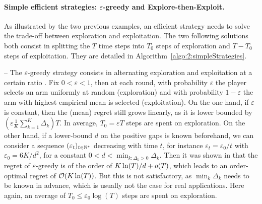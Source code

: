 \paragraph{Simple efficient strategies: $\varepsilon$-greedy and Explore-then-Exploit.}

As illustrated by the two previous examples, an efficient strategy needs to solve the trade-off between exploration and exploitation.
The two following solutions both consist in splitting the $T$ time steps into $T_0$ steps of exploration and $T-T_0$ steps of exploitation.
They are detailed in Algorithm~\ref{algo:2:simpleStrategies}.

-- The \textcolor{deeppurple}{$\varepsilon$-greedy strategy} consists in alternating exploration and exploitation at a certain ratio \cite{Auer02}.
Fix $0<\varepsilon<1$, then at each round, with probability $\varepsilon$ the player selects an arm uniformly at random (exploration) and with probability $1-\varepsilon$ the arm with highest empirical mean is selected (exploitation).
On the one hand, if $\varepsilon$ is constant, then the (mean) regret still grows linearly, as it is lower bounded by $(\varepsilon \frac{1}{K} \sum_{k=1}^K \Delta_k) T$.
In average, $T_0 = \varepsilon T$ steps are spent on exploration.
%
On the other hand, if a lower-bound $d$ on the positive gaps is known beforehand,
we can consider a sequence $(\varepsilon_t)_{t\in\mathbb{N}^*}$ decreasing with time $t$, for instance $\varepsilon_t = \varepsilon_0 / t$ with $\varepsilon_0 = 6 K / d^2$, for a constant $0 < d < \min_{k: \Delta_k > 0} \Delta_k$.
Then it was shown in \cite{Auer02} that the regret of $\varepsilon$-greedy is of the order of $K \ln(T) / d + \mathop{}\mathopen{}o\mathopen{}\left(T\right)$, which leads to an order-optimal regret of $\mathop{}\mathopen{}\mathcal{O}\mathopen{}\left(K \ln(T)\right)$.
But this is not satisfactory, as $\min_k \Delta_k$ needs to be known in advance, which is usually not the case for real applications.
Here again, an average of $T_0 \leq \varepsilon_0 \log(T)$ steps are spent on exploration.

